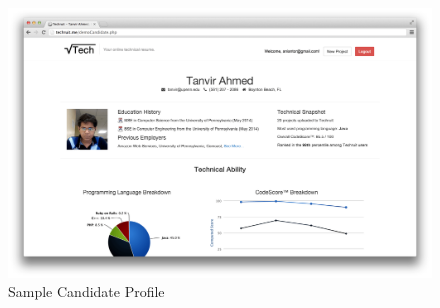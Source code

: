 \documentclass{sig-alternate}
\begin{document}
\begin{figure}[ht]
	\begin{center}
		\includegraphics[width=500px]{sample_candidate}
	\end{center}
	\vspace{-12pt}
	\caption{Sample Candidate Profile}
	\label{fig:candidate}
\end{figure}



\end{document}
